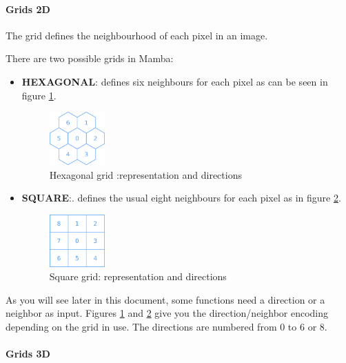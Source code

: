 \documentclass[a4paper,10pt,oneside]{article}
\begin{document}
\paragraph{Grids 2D}

The grid defines the neighbourhood of each pixel in an image.

There are two possible grids in Mamba:

\begin{itemize}
\item \textbf{HEXAGONAL}: defines six neighbours for each pixel as can be seen in 
figure \ref{fig:hxgriddir}.

\begin{figure}
\centering
\includegraphics[width=0.2\textwidth]{figures/hexa_grid.pdf}
\caption{Hexagonal grid :representation and directions}
\label{fig:hxgriddir}
\end{figure}

\item \textbf{SQUARE}:. defines the usual eight neighbours for each pixel as
in figure \ref{fig:sqgriddir}.

\begin{figure}
\centering
\includegraphics[width=0.2\textwidth]{figures/square_grid.pdf}
\caption{Square grid: representation and directions}
\label{fig:sqgriddir}
\end{figure}

\end{itemize}

As you will see later in this document, some functions need a direction or a 
neighbor as input. Figures \ref{fig:hxgriddir} and \ref{fig:sqgriddir} give you
the direction/neighbor encoding depending on the grid in use. The directions
are numbered from 0 to 6 or 8.

\paragraph{Grids 3D}
\end{document}
